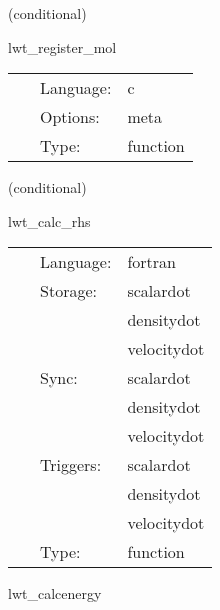 \vspace{5mm}

   (conditional) 

\hspace{5mm} lwt\_register\_mol 

\hspace{5mm}{\it register variables with mol } 


\hspace{5mm}

 \begin{tabular*}{160mm}{cll} 
~ & Language:  & c \\ 
~ & Options:  & meta \\ 
~ & Type:  & function \\ 
\end{tabular*} 


\vspace{5mm}

   (conditional) 

\hspace{5mm} lwt\_calc\_rhs 

\hspace{5mm}{\it calculate the rhs } 


\hspace{5mm}

 \begin{tabular*}{160mm}{cll} 
~ & Language:  & fortran \\ 
~ & Storage:  & scalardot \\ 
~& ~ &densitydot\\ 
~& ~ &velocitydot\\ 
~ & Sync:  & scalardot \\ 
~& ~ &densitydot\\ 
~& ~ &velocitydot\\ 
~ & Triggers:  & scalardot \\ 
~& ~ &densitydot\\ 
~& ~ &velocitydot\\ 
~ & Type:  & function \\ 
\end{tabular*} 


\vspace{5mm}


\hspace{5mm} lwt\_calcenergy 

\hspace{5mm}{\it calculate the energy of the scalar field } 


